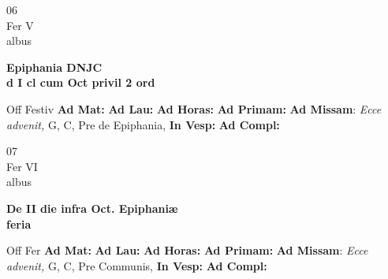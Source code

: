 \documentclass[10pt, openany]{book}
\begin{document}
        \begin{center}
            \begin{minipage}{3.5in}
                \vspace{2em}
                \begin{minipage}{0.5in}
                    {\Huge 06} \\
                    {\normalsize Fer V} \\
                    {\normalsize albus}
                \end{minipage}
                \begin{minipage}{3.0in}
                    \textbf{ \large Epiphania DNJC \\
                    \textnormal{\normalsize d I cl cum Oct privil 2 ord}} \\ 
                \end{minipage}
                \begin{justify}Off Festiv
                    \textbf{Ad Mat: }
                    \textbf{Ad Lau: }
                    \textbf{Ad Horas: }
                    \textbf{Ad Primam: }\textbf{Ad Missam}: \textit{Ecce advenit,} G, C, Pre de Epiphania,  
                    \textbf{In Vesp: }
                    \textbf{Ad Compl: }
                \end{justify}
            \end{minipage}
        \end{center}
    
        \begin{center}
            \begin{minipage}{3.5in}
                \vspace{2em}
                \begin{minipage}{0.5in}
                    {\Huge 07} \\
                    {\normalsize Fer VI} \\
                    {\normalsize albus}
                \end{minipage}
                \begin{minipage}{3.0in}
                    \textbf{ \large De II die infra Oct. Epiphaniæ \\
                    \textnormal{\normalsize feria}} \\ 
                \end{minipage}
                \begin{justify}Off Fer
                    \textbf{Ad Mat: }
                    \textbf{Ad Lau: }
                    \textbf{Ad Horas: }
                    \textbf{Ad Primam: }\textbf{Ad Missam}: \textit{Ecce advenit,} G, C, Pre Communis,  
                    \textbf{In Vesp: }
                    \textbf{Ad Compl: }
                \end{justify}
            \end{minipage}
        \end{center}
    
\end{document}
